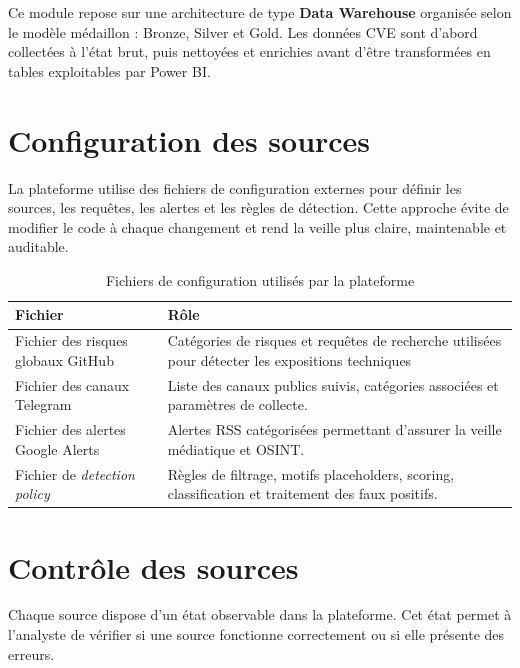 \documentclass[12pt,a4paper]{report}
\begin{document}
Ce module repose sur une architecture de type \textbf{Data Warehouse} organisée selon le modèle médaillon : Bronze, Silver et Gold. Les données CVE sont d'abord collectées à l'état brut, puis nettoyées et enrichies avant d'être transformées en tables exploitables par Power BI.

\section{Configuration des sources}

La plateforme utilise des fichiers de configuration externes pour définir les sources, les requêtes, les alertes et les règles de détection. Cette approche évite de modifier le code à chaque changement et rend la veille plus claire, maintenable et auditable.



\begin{table}[H]
\centering
\caption{Fichiers de configuration utilisés par la plateforme}
\label{tab:config-files}
\begin{tabularx}{\linewidth}{|l|>{\raggedright\arraybackslash}X|}
\hline
\rowcolor{primary!15}
\textbf{Fichier} & \textbf{Rôle} \\ \hline
Fichier des risques globaux GitHub & Catégories de risques et requêtes de recherche utilisées pour détecter les expositions techniques \\ \hline
Fichier des canaux Telegram & Liste des canaux publics suivis, catégories associées et paramètres de collecte. \\ \hline
Fichier des alertes Google Alerts & Alertes RSS catégorisées permettant d'assurer la veille médiatique et OSINT. \\ \hline
Fichier de \textit{detection policy} & Règles de filtrage, motifs placeholders, scoring, classification et traitement des faux positifs. \\ \hline
\end{tabularx}
\end{table}



\section{Contrôle des sources}

Chaque source dispose d'un état observable dans la plateforme. Cet état permet à l'analyste de vérifier si une source fonctionne correctement ou si elle présente des erreurs.
\end{document}
